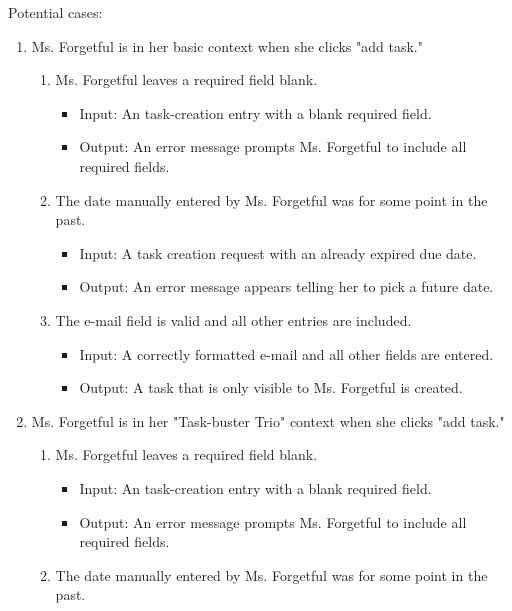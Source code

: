 \documentclass{article}
\begin{document}
Potential cases:
\begin{enumerate}
    \item Ms. Forgetful is in her basic context when she clicks "add task."
    \begin{enumerate}
        \item Ms. Forgetful leaves a required field blank.
            \begin{itemize}
                \item Input: An task-creation entry with a blank required field.
                \item Output: An error message prompts Ms. Forgetful to include all required fields.
            \end{itemize}
        \item The date manually entered by Ms. Forgetful was for some point in the past.
            \begin{itemize}
                \item Input: A task creation request with an already expired due date.
                \item Output: An error message appears telling her to pick a future date.
            \end{itemize}
        \item The e-mail field is valid and all other entries are included.
            \begin{itemize}
                \item Input: A correctly formatted e-mail and all other fields are entered.
                \item Output: A task that is only visible to Ms. Forgetful is created.
            \end{itemize}
    \end{enumerate}
\item Ms. Forgetful is in her "Task-buster Trio" context when she clicks "add task."
     \begin{enumerate}
        \item Ms. Forgetful leaves a required field blank.
            \begin{itemize}
                \item Input: An task-creation entry with a blank required field.
                \item Output: An error message prompts Ms. Forgetful to include all required fields.
            \end{itemize}
        \item The date manually entered by Ms. Forgetful was for some point in the past.

\end{enumerate}
\end{enumerate}
\end{document}

